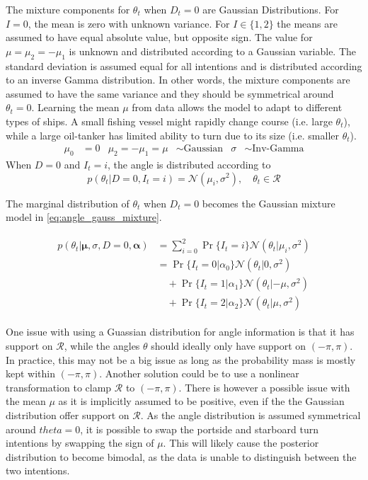 The mixture components for $\theta_t$ when $D_t=0$ are Gaussian Distributions. For $I=0$, the mean is zero with unknown variance. For $I \in \{1, 2\}$ the means are assumed to have equal absolute value, but opposite sign. The value for $\mu = \mu_2 = -\mu_1$ is unknown and distributed according to a Gaussian variable. The standard deviation is assumed equal for all intentions and is distributed according to an inverse Gamma distribution. In other words, the mixture components are assumed to have the same variance and they should be symmetrical around $\theta_t=0$.
Learning the mean $\mu$ from data allows the model to adapt to different types of ships. A small fishing vessel might rapidly change course (i.e. large $\theta_t$), while a large oil-tanker has limited ability to turn due to its size (i.e. smaller $\theta_t$). 
\begin{align}
    \mu_0 &= 0 &  \mu_{2} = - \mu_{1} = \mu &\sim \text{Gaussian} & \sigma &\sim \text{Inv-Gamma}
\end{align}
When $D=0$ and $I_t=i$, the angle is distributed according to
\begin{equation}\label{eq:theta_intention_mixture}
    p(\theta_t | D=0, I_t=i) = \mathcal{N}(\mu_i, \sigma^2), \quad \theta_t \in \mathcal{R}
\end{equation}

The marginal distribution of $\theta_t$ when $D_t=0$ becomes the Gaussian mixture model in \cref{eq:angle_gauss_mixture}.

\begin{align}\label{eq:angle_gauss_mixture}
\begin{split}
    p(\theta_t | \boldsymbol{\mu}, \sigma, D=0, \boldsymbol{\alpha}) &= \sum_{i=0}^2 \Pr\{I_t=i\}\mathcal{N}(\theta_t | \mu_i, \sigma^2) \\
    &=\Pr\{I_t=0 | \alpha_0\}\mathcal{N}(\theta_t | 0, \sigma^2)\\
    &\quad+\Pr\{I_t=1 | \alpha_1\}\mathcal{N}(\theta_t | -\mu, \sigma^2)\\
    &\quad+\Pr\{I_t=2 | \alpha_2\}\mathcal{N}(\theta_t | \mu, \sigma^2)
\end{split}
\end{align}

One issue with using a Guassian distribution for angle information is that it has support on $\mathcal{R}$, while the angles $\theta$ should ideally only have support on $(-\pi, \pi)$. In practice, this may not be a big issue as long as the probability mass is mostly kept within $(-\pi, \pi)$. Another solution could be to use a nonlinear transformation to clamp $\mathcal{R}$ to $(-\pi, \pi)$. There is however a possible issue with the mean $\mu$ as it is implicitly assumed to be positive, even if the the Gaussian distribution offer support on $\mathcal{R}$. As the angle distribution is assumed symmetrical around $theta=0$, it is possible to swap the portside and starboard turn intentions by swapping the sign of $\mu$. This will likely cause the posterior distribution to become bimodal, as the data is unable to distinguish between the two intentions.  

